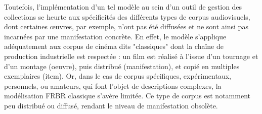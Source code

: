 Toutefois, l’implémentation d’un tel modèle au sein d’un outil de gestion des collections se heurte aux spécificités des différents types de corpus audiovisuels, dont certaines œuvres, par exemple, n'ont pas été diffusées et ne sont ainsi pas incarnées par une manifestation concrète. En effet, le modèle s'applique adéquatement aux corpus de cinéma dits "classiques" dont la chaîne de production industrielle est respectée : un film est réalisé à l'issue d'un tournage et d'un montage (\gls{oeuvre}), puis distribué (\gls{manifestation}), et copié en multiples exemplaires (\gls{item}). Or, dans le cas de corpus spécifiques, expérimentaux, personnels, ou amateurs, qui font l’objet de descriptions complexes, la modélisation \gls{FRBR} classique s'avère limitée. Ce type de corpus est notamment peu distribué ou diffusé, rendant le niveau de \gls{manifestation} obsolète. 


